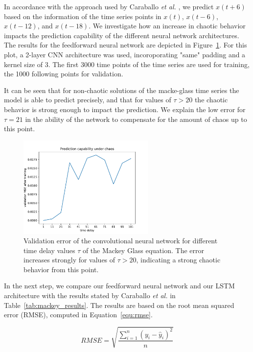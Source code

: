 \documentclass{article}
\begin{document}
In accordance with the approach used by Caraballo \textit{et al.}
\cite{caraballo2016}, we predict $x(t+6)$ based on the information of the time 
series points in $x(t)$, $x(t-6)$, $x(t-12)$, and $x(t-18)$. We investigate how
an increase in chaotic behavior impacts the prediction capability of the
different neural network architectures. The results for the feedforward neural
network are depicted in Figure~\ref{fig:mackey_cnn}. For this plot, a 2-layer 
CNN architecture was used, incoroporating "same" padding and a kernel size of 3.
The first 3000 time points of the time series are used for training, the 1000 
following points for validation.

It can be seen that for non-chaotic solutions of the macke-glass time series the
model is able to predict precisely, and that for values of $\tau > 20$ the 
chaotic behavior is strong enough to impact the prediction. We explain the low
error for $\tau = 21$ in the ability of the network to compensate for the amount
of chaos up to this point.
 
\begin{figure}
  \centering
  \includegraphics[width=0.6\textwidth]{figures/mackey_glass_cnn.pdf}
  \caption{Validation error of the convolutional neural network for different 
  time delay values $\tau$ of the Mackey Glass equation. The error increases 
  strongly for values of $\tau > 20$, indicating a strong chaotic behavior 
  from this point.}
  \label{fig:mackey_cnn}
\end{figure}

In the next step, we compare our feedforward neural network and our LSTM 
architecture with the results stated by Caraballo \textit{et al.} 
\cite{caraballo2016} in Table~\ref{tab:mackey_results}. The results are based 
on the root mean squared error (RMSE), computed in Equation~\ref{equ:rmse}.

\begin{equation}
  RMSE = \sqrt{\frac{\sum_{i=1}^n (y_i - \hat{y}_i)^2}{n}}
  \label{equ:rmse}
\end{equation}
\end{document}
